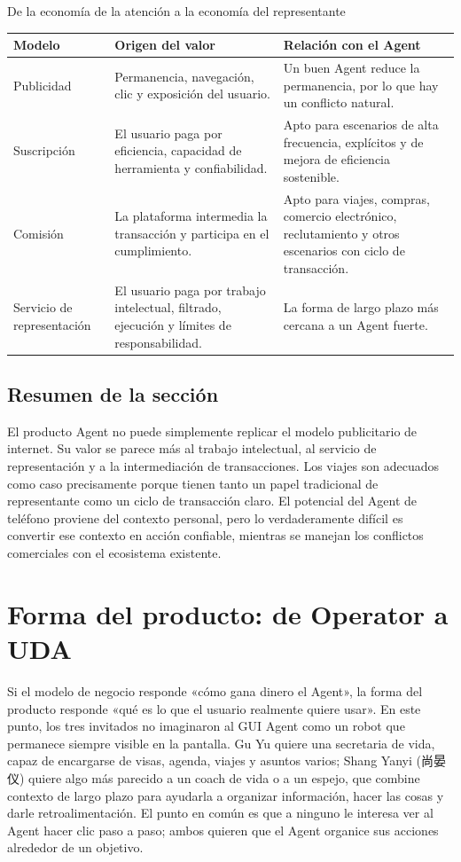 \documentclass[a4paper]{article}
\begin{document}
\begin{knowledgebox}{De la economía de la atención a la economía del representante}
\begin{tabularx}{\textwidth}{>{\raggedright\arraybackslash}p{} Y Y}
\toprule
Modelo & Origen del valor & Relación con el Agent \\
\midrule
Publicidad & Permanencia, navegación, clic y exposición del usuario. & Un buen Agent reduce la permanencia, por lo que hay un conflicto natural. \\
Suscripción & El usuario paga por eficiencia, capacidad de herramienta y confiabilidad. & Apto para escenarios de alta frecuencia, explícitos y de mejora de eficiencia sostenible. \\
Comisión & La plataforma intermedia la transacción y participa en el cumplimiento. & Apto para viajes, compras, comercio electrónico, reclutamiento y otros escenarios con ciclo de transacción. \\
Servicio de representación & El usuario paga por trabajo intelectual, filtrado, ejecución y límites de responsabilidad. & La forma de largo plazo más cercana a un Agent fuerte. \\
\bottomrule
\end{tabularx}
\end{knowledgebox}

\subsection{Resumen de la sección}

El producto Agent no puede simplemente replicar el modelo publicitario de internet. Su valor se parece más al trabajo intelectual, al servicio de representación y a la intermediación de transacciones. Los viajes son adecuados como caso precisamente porque tienen tanto un papel tradicional de representante como un ciclo de transacción claro. El potencial del Agent de teléfono proviene del contexto personal, pero lo verdaderamente difícil es convertir ese contexto en acción confiable, mientras se manejan los conflictos comerciales con el ecosistema existente.
\section{Forma del producto: de Operator a UDA}

Si el modelo de negocio responde «cómo gana dinero el Agent», la forma del producto responde «qué es lo que el usuario realmente quiere usar». En este punto, los tres invitados no imaginaron al GUI Agent como un robot que permanece siempre visible en la pantalla. Gu Yu quiere una secretaria de vida, capaz de encargarse de visas, agenda, viajes y asuntos varios; Shang Yanyi (尚晏仪) quiere algo más parecido a un coach de vida o a un espejo, que combine contexto de largo plazo para ayudarla a organizar información, hacer las cosas y darle retroalimentación. El punto en común es que a ninguno le interesa ver al Agent hacer clic paso a paso; ambos quieren que el Agent organice sus acciones alrededor de un objetivo.
\end{document}
